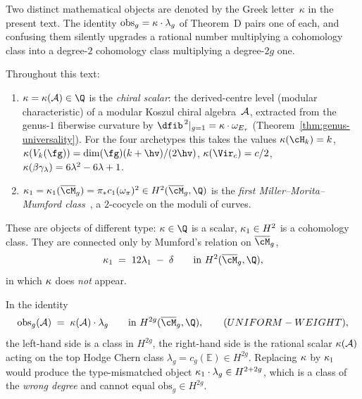 Two distinct mathematical objects are denoted by the Greek
letter~$\kappa$ in the present text. The identity
$\mathrm{obs}_g=\kscal\cdot\lambda_g$ of Theorem~D pairs one of each,
and confusing them silently upgrades a rational number multiplying a
cohomology class into a degree-$2$ cohomology class multiplying a
degree-$2g$ one.

\begin{definition}
\label{def:kappa-scalar-vs-mumford}
Throughout this text:
\begin{enumerate}[label=\textup{(\alph*)}]
\item $\kscal=\kscal(\cA)\in\Q$ is the \emph{chiral scalar}: the
derived-centre level (modular characteristic) of a modular Koszul
chiral algebra~$\mathcal{A}$, extracted from the genus-$1$ fiberwise
curvature by $\dfib^{\,2}|_{g=1}=\kscal\cdot\omega_{E_\tau}$
\textup{(}Theorem~\ref{thm:genus-universality}\textup{)}. For the
four archetypes this takes the values
$\kscal(\cH_k)=k$,\;
$\kscal(V_k(\fg))=\dim(\fg)(k+\hv)/(2\hv)$,\;
$\kscal(\Vir_c)=c/2$,\;
$\kappa(\beta\gamma_\lambda)=6\lambda^{2}-6\lambda+1$.
\item $\kMum=\kMum(\overline{\cM}_g)=\pi_*c_1(\omega_\pi)^{2}
\in H^{2}(\overline{\cM}_g,\Q)$ is the \emph{first
Miller--Morita--Mumford class}~\cite{Mumford83,MillerMorita}, a
$2$-cocycle on the moduli of curves.
\end{enumerate}
These are objects of different type: $\kscal\in\Q$ is a scalar,
$\kappa_{1}\in H^{2}$ is a cohomology class. They are connected only by
Mumford's relation on $\overline{\cM}_g$,
\begin{equation}\label{eq:mumford-noether-relation}
\kMum \;=\; 12\lambda_1 \;-\; \delta
\qquad \textup{in } H^{2}(\overline{\cM}_g,\Q),
\end{equation}
in which $\kappa$ does \emph{not} appear.
\end{definition}

\begin{lemma}[Type discipline in the identity
$\mathrm{obs}_g=\kscal\cdot\lambda_g$; \ClaimStatusProvedHere]
\label{lem:theorem-D-type-discipline}
In the identity
\[
\mathrm{obs}_g(\cA) \;=\; \kscal(\cA)\cdot\lambda_g
\qquad \textup{in } H^{2g}(\overline{\cM}_g,\Q),
\qquad \textup{(}UNIFORM-WEIGHT\textup{)},
\]
the left-hand side is a class in $H^{2g}$, the right-hand side is
the rational scalar $\kappa(\mathcal{A})$ acting on the top Hodge Chern class
$\lambda_g=c_g(\mathbb{E})\in H^{2g}$. Replacing $\kappa$ by $\kappa_{1}$
would produce the type-mismatched object $\kappa_{1}\cdot\lambda_g\in
H^{2+2g}$, which is a class of the \emph{wrong degree} and cannot
equal $\mathrm{obs}_g\in H^{2g}$.
\end{lemma}

